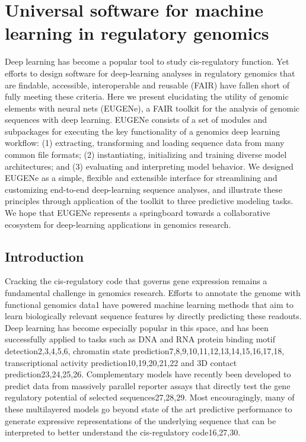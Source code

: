 \chapter{Universal software for machine learning in regulatory genomics}
\label{chap:Universal software for machine learning in regulatory genomics}

Deep learning has become a popular tool to study cis-regulatory function. Yet efforts to design software for deep-learning analyses in regulatory genomics that are findable, accessible, interoperable and reusable (FAIR) have fallen short of fully meeting these criteria. Here we present elucidating the utility of genomic elements with neural nets (EUGENe), a FAIR toolkit for the analysis of genomic sequences with deep learning. EUGENe consists of a set of modules and subpackages for executing the key functionality of a genomics deep learning workflow: (1) extracting, transforming and loading sequence data from many common file formats; (2) instantiating, initializing and training diverse model architectures; and (3) evaluating and interpreting model behavior. We designed EUGENe as a simple, flexible and extensible interface for streamlining and customizing end-to-end deep-learning sequence analyses, and illustrate these principles through application of the toolkit to three predictive modeling tasks. We hope that EUGENe represents a springboard towards a collaborative ecosystem for deep-learning applications in genomics research.

\section{Introduction}

Cracking the cis-regulatory code that governs gene expression remains a fundamental challenge in genomics research. Efforts to annotate the genome with functional genomics data1 have powered machine learning methods that aim to learn biologically relevant sequence features by directly predicting these readouts. Deep learning has become especially popular in this space, and has been successfully applied to tasks such as DNA and RNA protein binding motif detection2,3,4,5,6, chromatin state prediction7,8,9,10,11,12,13,14,15,16,17,18, transcriptional activity prediction10,19,20,21,22 and 3D contact prediction23,24,25,26. Complementary models have recently been developed to predict data from massively parallel reporter assays that directly test the gene regulatory potential of selected sequences27,28,29. Most encouragingly, many of these multilayered models go beyond state of the art predictive performance to generate expressive representations of the underlying sequence that can be interpreted to better understand the cis-regulatory code16,27,30.


